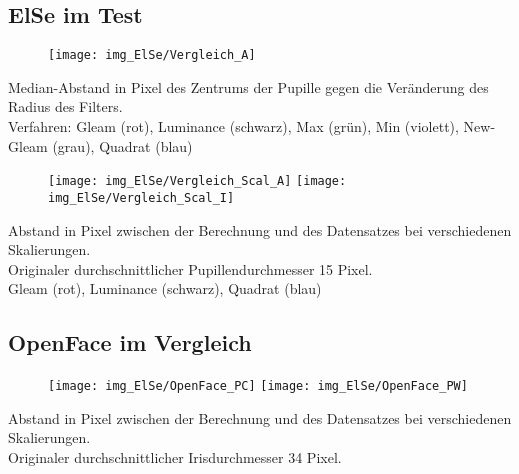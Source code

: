 \subsection{ElSe im Test}
\begin{frame}
\begin{figure}
	\centering
	\texttt{[image: img\_ElSe/Vergleich\_A]}
\end{figure}
Median-Abstand in Pixel des Zentrums der Pupille gegen die Veränderung des Radius des Filters.\\
Verfahren: Gleam (rot), Luminance (schwarz), Max (grün), Min (violett), New-Gleam (grau), Quadrat (blau)
\end{frame}
\begin{frame}
\begin{figure}
	\centering
	\texttt{[image: img\_ElSe/Vergleich\_Scal\_A]}
	\texttt{[image: img\_ElSe/Vergleich\_Scal\_I]}
\end{figure}
Abstand in Pixel zwischen der Berechnung und des Datensatzes bei verschiedenen Skalierungen.\\
Originaler durchschnittlicher Pupillendurchmesser 15 Pixel.\\
Gleam (rot), Luminance (schwarz),  Quadrat (blau)
\end{frame}
\subsection{OpenFace im Vergleich}
\begin{frame}
\begin{figure}
	\centering
	\texttt{[image: img\_ElSe/OpenFace\_PC]}
	\texttt{[image: img\_ElSe/OpenFace\_PW]}
\end{figure}
Abstand in Pixel zwischen der Berechnung und des Datensatzes bei verschiedenen Skalierungen.\\
Originaler durchschnittlicher Irisdurchmesser 34 Pixel.\\
\end{frame}